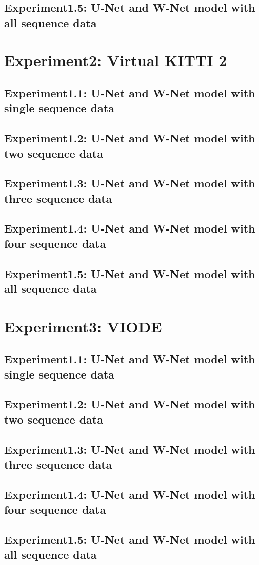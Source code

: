     \subsection{Experiment1.5: U-Net and W-Net model with all sequence data}
    \section{Experiment2: Virtual KITTI 2}
    \subsection{Experiment1.1: U-Net and W-Net model with single sequence data}
    \subsection{Experiment1.2: U-Net and W-Net model with two sequence data}
    \subsection{Experiment1.3: U-Net and W-Net model with three sequence data}
    \subsection{Experiment1.4: U-Net and W-Net model with four sequence data}
    \subsection{Experiment1.5: U-Net and W-Net model with all sequence data}
    \section{Experiment3: VIODE}
    \subsection{Experiment1.1: U-Net and W-Net model with single sequence data}
    \subsection{Experiment1.2: U-Net and W-Net model with two sequence data}
    \subsection{Experiment1.3: U-Net and W-Net model with three sequence data}
    \subsection{Experiment1.4: U-Net and W-Net model with four sequence data}
    \subsection{Experiment1.5: U-Net and W-Net model with all sequence data}
    

